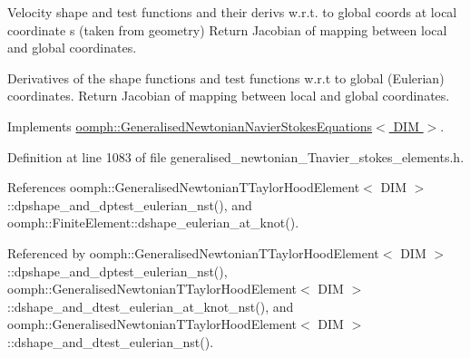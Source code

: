 Velocity shape and test functions and their derivs w.\+r.\+t. to global coords at local coordinate s (taken from geometry) Return Jacobian of mapping between local and global coordinates. 

Derivatives of the shape functions and test functions w.\+r.\+t to global (Eulerian) coordinates. Return Jacobian of mapping between local and global coordinates. 

Implements \hyperlink{classoomph_1_1GeneralisedNewtonianNavierStokesEquations_a20efdbf511d69c1176c6b3df4dfc5fb3}{oomph\+::\+Generalised\+Newtonian\+Navier\+Stokes\+Equations$<$ D\+I\+M $>$}.



Definition at line 1083 of file generalised\+\_\+newtonian\+\_\+\+Tnavier\+\_\+stokes\+\_\+elements.\+h.



References oomph\+::\+Generalised\+Newtonian\+T\+Taylor\+Hood\+Element$<$ D\+I\+M $>$\+::dpshape\+\_\+and\+\_\+dptest\+\_\+eulerian\+\_\+nst(), and oomph\+::\+Finite\+Element\+::dshape\+\_\+eulerian\+\_\+at\+\_\+knot().



Referenced by oomph\+::\+Generalised\+Newtonian\+T\+Taylor\+Hood\+Element$<$ D\+I\+M $>$\+::dpshape\+\_\+and\+\_\+dptest\+\_\+eulerian\+\_\+nst(), oomph\+::\+Generalised\+Newtonian\+T\+Taylor\+Hood\+Element$<$ D\+I\+M $>$\+::dshape\+\_\+and\+\_\+dtest\+\_\+eulerian\+\_\+at\+\_\+knot\+\_\+nst(), and oomph\+::\+Generalised\+Newtonian\+T\+Taylor\+Hood\+Element$<$ D\+I\+M $>$\+::dshape\+\_\+and\+\_\+dtest\+\_\+eulerian\+\_\+nst().

\mbox{\label{classoomph_1_1GeneralisedNewtonianTTaylorHoodElement_a9eb34140e29eca1a2f7f7e773d9d36cc}} 
